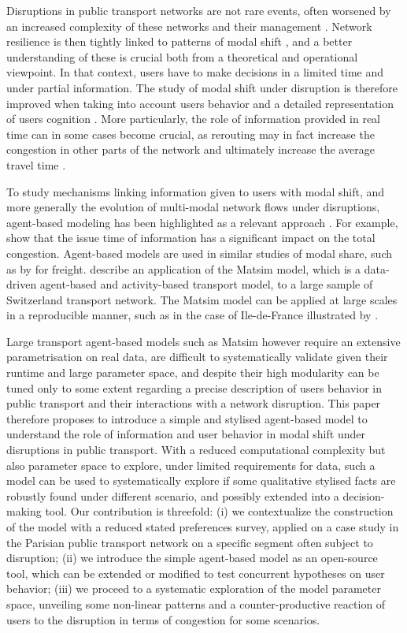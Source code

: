 \documentclass[3p,times,procedia]{elsarticle}
\begin{document}
Disruptions in public transport networks are not rare events, often worsened by an increased complexity of these networks and their management \citep{dekker2018next}. Network resilience is then tightly linked to patterns of modal shift \cite{stamos2015impact}, and a better understanding of these is crucial both from a theoretical and operational viewpoint. In that context, users have to make decisions in a limited time and under partial information. The study of modal shift under disruption is therefore improved when taking into account users behavior and a detailed representation of users cognition \citep{brisbois2010processus}. More particularly, the role of information provided in real time can in some cases become crucial, as rerouting may in fact increase the congestion in other parts of the network and ultimately increase the average travel time \citep{chatterjee2002driver,chorus2006travel}.

To study mechanisms linking information given to users with modal shift, and more generally the evolution of multi-modal network flows under disruptions, agent-based modeling has been highlighted as a relevant approach \citep{leng2020role}. For example, \cite{leng2020issue} show that the issue time of information has a significant impact on the total congestion. Agent-based models are used in similar studies of modal share, such as by \cite{baindur2011agent} for freight. \cite{raney2003agent} describe an application of the Matsim model, which is a data-driven agent-based and activity-based transport model, to a large sample of Switzerland transport network. The Matsim model can be applied at large scales in a reproducible manner, such as in the case of Ile-de-France illustrated by \cite{horl2020reproducible}.

Large transport agent-based models such as Matsim however require an extensive parametrisation on real data, are difficult to systematically validate given their runtime and large parameter space, and despite their high modularity can be tuned only to some extent regarding a precise description of users behavior in public transport and their interactions with a network disruption. This paper therefore proposes to introduce a simple and stylised agent-based model to understand the role of information and user behavior in modal shift under disruptions in public transport. With a reduced computational complexity but also parameter space to explore, under limited requirements for data, such a model can be used to systematically explore if some qualitative stylised facts are robustly found under different scenario, and possibly extended into a decision-making tool. Our contribution is threefold: (i) we contextualize the construction of the model with a reduced stated preferences survey, applied on a case study in the Parisian public transport network on a specific segment often subject to disruption; (ii) we introduce the simple agent-based model as an open-source tool, which can be extended or modified to test concurrent hypotheses on user behavior; (iii) we proceed to a systematic exploration of the model parameter space, unveiling some non-linear patterns and a counter-productive reaction of users to the disruption in terms of congestion for some scenarios.
\end{document}
